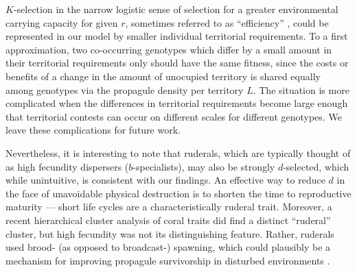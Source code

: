 \documentclass[11pt]{article}
\begin{document}
$K$-selection in the narrow logistic sense of selection for a greater environmental carrying capacity for given $r$, sometimes referred to as ``efficiency'' \citep{macarthur_1967}, could be represented in our model by smaller individual territorial requirements. To a first approximation, two co-occurring genotypes which differ by a small amount in their territorial requirements only should have the same fitness, since the costs or benefits of a change in the amount of unocupied territory is shared equally among genotypes via the propagule density per territory $L$. The situation is more complicated when the differences in territorial requirements become large enough that territorial contests can occur on different scales for different genotypes. We leave these complications for future work. 

Nevertheless, it is interesting to note that ruderals, which are typically thought of as high fecundity dispersers ($b$-specialists), may also be strongly $d$-selected, which while unintuitive, is consistent with our findings. An effective way to reduce $d$ in the face of unavoidable physical destruction is to shorten the time to reproductive maturity --- short life cycles are a characteristically ruderal trait. Moreover, a recent hierarchical cluster analysis of coral traits did find a distinct ``ruderal'' cluster, but high fecundity was not its distinguishing feature. Rather, ruderals used brood- (as opposed to broadcast-) spawning, which could plausibly be a mechanism for improving propagule survivorship in disturbed environments \citep{darling_2012}. 
\end{document}
